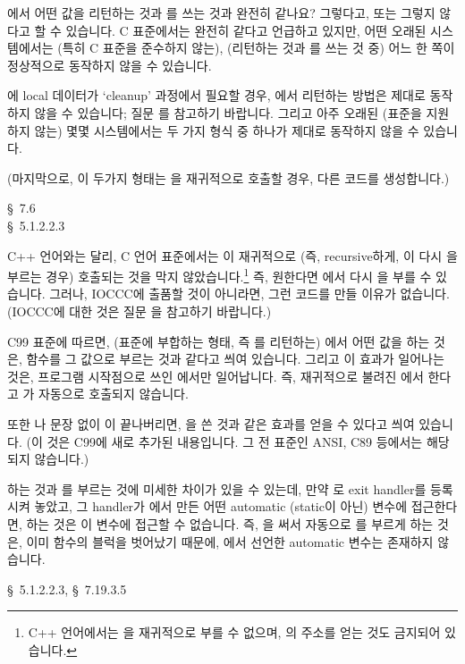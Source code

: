 \begin{faq}
	에서 어떤 값을 리턴하는 것과 를 쓰는 것과
	완전히 같나요?
\A
	그렇다고, 또는 그렇지 않다고 할 수 있습니다.
	C 표준에서는 완전히 같다고 언급하고 있지만,  어떤 오래된 시스템에서는
        (특히 C 표준을 준수하지 않는), (리턴하는 것과 를 쓰는 것 중)
        어느 한 쪽이 정상적으로 동작하지 않을 수 있습니다.
        
	에 local 데이터가 `cleanup' 과정에서 필요할 경우,
	 에서 리턴하는 방법은 제대로 동작하지 않을 수 있습니다;
	질문 를 참고하기 바랍니다.
	그리고 아주 오래된 (표준을 지원하지 않는) 몇몇 시스템에서는 
	두 가지 형식 중 하나가 제대로 동작하지 않을 수 있습니다.

	(마지막으로, 이 두가지 형태는 을 재귀적으로 호출할 경우,
	다른 코드를 생성합니다.)

\R	\cite{kr2} \S\ 7.6  \\
	\cite{c89} \S\ 5.1.2.2.3

\T
	C++ 언어와는 달리, C 언어 표준에서는 이 재귀적으로
        (즉, recursive하게, 이 다시 을 부르는 경우)
        호출되는 것을 막지
        않았습니다.\footnote{C++ 언어에서는 을 재귀적으로 부를 수
          없으며, 의 주소를 얻는 것도 금지되어 있습니다.}
        즉, 원한다면 에서 다시 을 부를 수 있습니다.
        그러나, IOCCC에 출품할 것이 아니라면, 그런 코드를 만들 이유가
        없습니다. (IOCCC에 대한 것은 질문 을 참고하기 바랍니다.)

        C99 표준에 따르면, (표준에 부합하는 형태, 즉 를 리턴하는)
        에서 어떤 값을  하는 것은, 
         함수를 그 값으로 부르는 것과 같다고 씌여 있습니다.
        그리고 이 효과가 일어나는 것은, 프로그램 시작점으로 쓰인 에서만
        일어납니다. 즉, 재귀적으로 불려진 에서 한다고
        가 자동으로 호출되지 않습니다.

        또한 나  문장 없이 이 끝나버리면, 
        을 쓴 것과 같은 효과를 얻을 수 있다고 씌여 있습니다.
        (이 것은 C99에 새로 추가된 내용입니다. 그 전 표준인 ANSI, C89 등에서는
        해당되지 않습니다.)

        하는 것과 를 부르는 것에 미세한 차이가 있을 수
        있는데, 만약 로 exit handler를 등록시켜 놓았고, 그 handler가
        에서 만든 어떤 automatic (static이 아닌) 변수에 접근한다면,
        하는 것은 이 변수에 접근할 수 없습니다.
        즉, 을 써서 자동으로 를 부르게 하는 것은, 이미
         함수의 블럭을 벗어났기 때문에, 에서 선언한 automatic
        변수는 존재하지 않습니다.

\R
	\cite{c99} \S\ 5.1.2.2.3, \S\ 7.19.3.5

\end{faq}

